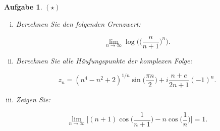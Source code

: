 \documentclass[a4paper, 20]{exam}
\newtheorem{ex}{Aufgabe}
\begin{document}
\begin{ex}{$(\star)$}
\begin{enumerate}[i.)]
\item
Berechnen Sie den folgenden Grenzwert:

$$ \lim_{n \rightarrow \infty} \log \bigg( \Big( \frac{n}{n+1} \Big)^n \bigg).$$


\item
Berechnen Sie alle H\"aufungspunkte der komplexen Folge:

$$ z_n = (n^4 - n^2 + 2)^{1/n} \sin\bigg( \frac{\pi n}{2} \bigg) + i \frac{n + e}{2n + 1}(-1)^n. $$

\item
Zeigen Sie:

$$\lim_{n \rightarrow \infty} \bigg[ (n+1) \cos\bigg( \frac{1}{n+1} \bigg) - n \cos\bigg( \frac{1}{n} \bigg) \bigg]  =1.$$
\end{enumerate}
\end{ex}
\end{document}
